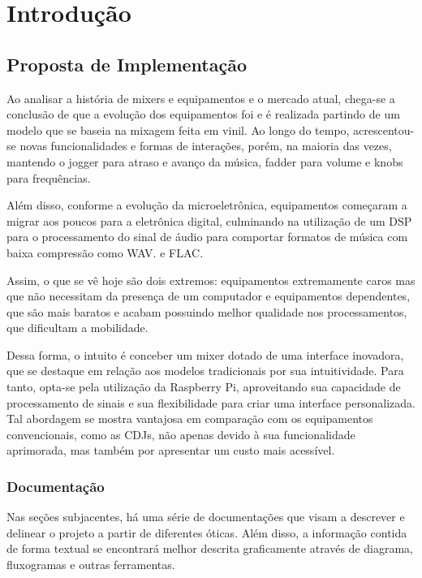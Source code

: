 \chapter[Introdução]{Introdução}

\section{Proposta de Implementação}

Ao analisar a história de mixers e equipamentos e o mercado atual, chega-se a conclusão de que a evolução dos equipamentos foi e é realizada partindo de um modelo que se baseia na mixagem feita em vinil. Ao longo do tempo, acrescentou-se novas funcionalidades e formas de interações, porém, na maioria das vezes, mantendo o jogger para atraso e avanço da música, fadder para volume e knobs para frequências.
\par
Além disso, conforme a evolução da microeletrônica, equipamentos começaram a migrar aos poucos para a eletrônica digital, culminando na utilização de um DSP para o processamento do sinal de áudio para comportar formatos de música com baixa compressão como WAV. e FLAC. 
\par
Assim, o que se vê hoje são dois extremos: equipamentos extremamente caros mas que não necessitam da presença de um computador e equipamentos dependentes, que são mais baratos e acabam possuindo melhor qualidade nos processamentos, que dificultam a mobilidade.
\par
Dessa forma, o intuito é conceber um mixer dotado de uma interface inovadora, que se destaque em relação aos modelos tradicionais por sua intuitividade. Para tanto, opta-se pela utilização da Raspberry Pi, aproveitando sua capacidade de processamento de sinais e sua flexibilidade para criar uma interface personalizada. Tal abordagem se mostra vantajosa em comparação com os equipamentos convencionais, como as CDJs, não apenas devido à sua funcionalidade aprimorada, mas também por apresentar um custo mais acessível.

\subsection{Documentação}
Nas seções subjacentes, há uma série de documentações que visam a descrever e delinear o projeto a partir de diferentes óticas. Além disso, a informação contida de forma textual se encontrará melhor descrita graficamente através de diagrama, fluxogramas e outras ferramentas.

